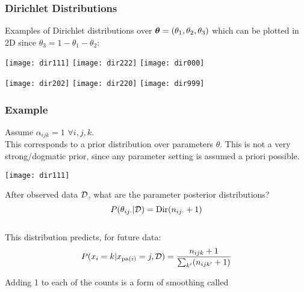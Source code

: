 \begin{frame}\frametitle{Dirichlet Distributions}

\vspace*{-3ex}
Examples of Dirichlet distributions over $\boldsymbol{\theta}=(\theta_1, \theta_2,
\theta_3)$ which 
can be plotted in 2D since $\theta_3=1-\theta_1-\theta_2$:

\vspace{2ex}

\centerline{
\texttt{[image: dir111]}
\texttt{[image: dir222]}
\texttt{[image: dir000]}
}

\vspace{1ex}

\centerline{
\texttt{[image: dir202]}
\texttt{[image: dir220]}
\texttt{[image: dir999]}
}

\end{frame}
\begin{frame}
\frametitle{Example}

\vspace*{-3ex}
\parbox{3.8in}{
Assume $\alpha_{ijk}=1$ $\forall i,j,k$. \\[2ex]
This corresponds to a  prior distribution over parameters
$\theta$. This is not a very strong/dogmatic prior, since any
parameter setting is assumed a priori possible.} 
 \hfill \texttt{[image: dir111]}

\vspace*{2ex}
After observed data $\mathcal{D}$, what are the parameter posterior
distributions? 
\[
P(\theta_{ij\cdot}|\mathcal{D}) = \mathrm{Dir}(n_{ij\cdot}+1)
\] \\

This distribution predicts, for future data:
\[
P(x_i=k|x_{\mathrm{pa}(i)}=j,\mathcal{D}) = \frac{n_{ijk}+1}{\sum_{k'} (n_{ijk'} +
  1)}
\]

Adding 1 to each of the counts is a form of smoothing called 

\end{frame}
